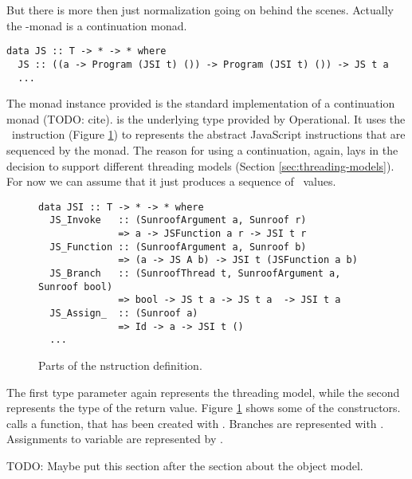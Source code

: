 But there is more then just normalization going on behind the scenes. 
Actually the \JS-monad is a continuation monad.
\begin{verbatim}
data JS :: T -> * -> * where
  JS :: ((a -> Program (JSI t) ()) -> Program (JSI t) ()) -> JS t a
  ...
\end{verbatim}
The monad instance provided is the standard implementation of 
a continuation monad (TODO: cite).
 is the underlying type provided by Operational.
It uses the \JSI~instruction (Figure \ref{fig:jsi-definition}) 
to represents the abstract JavaScript instructions
that are sequenced by the monad. The reason for using a
continuation, again, lays in the decision to support different
threading models (Section \ref{sec:threading-models}).
For now we can assume that it just produces a sequence of \JSI~values.
\begin{figure}
\begin{verbatim}
data JSI :: T -> * -> * where
  JS_Invoke   :: (SunroofArgument a, Sunroof r) 
              => a -> JSFunction a r -> JSI t r
  JS_Function :: (SunroofArgument a, Sunroof b) 
              => (a -> JS A b) -> JSI t (JSFunction a b)
  JS_Branch   :: (SunroofThread t, SunroofArgument a, Sunroof bool) 
              => bool -> JS t a -> JS t a  -> JSI t a
  JS_Assign_  :: (Sunroof a) 
              => Id -> a -> JSI t ()
  ...
\end{verbatim}
\label{fig:jsi-definition}
\caption{Parts of the \JSI nstruction definition.}
\end{figure}
The first type parameter again represents the threading model, while
the second represents the type of the return value. 
Figure \ref{fig:jsi-definition} shows some of the constructors.
 calls a function, that has been created with .
Branches are represented with . Assignments to variable
are represented by .

TODO: Maybe put this section after the section about the object model.

